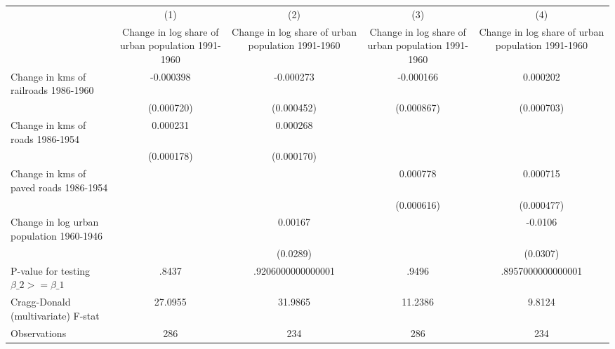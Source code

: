 {
\def\sym#1{\ifmmode^{#1}\else\(^{#1}\)\fi}
\begin{tabular}{l*{4}{c}}
\hline\hline
                &\multicolumn{1}{c}{(1)}&\multicolumn{1}{c}{(2)}&\multicolumn{1}{c}{(3)}&\multicolumn{1}{c}{(4)}\\
                &\multicolumn{1}{c}{Change in log share of urban population 1991-1960}&\multicolumn{1}{c}{Change in log share of urban population 1991-1960}&\multicolumn{1}{c}{Change in log share of urban population 1991-1960}&\multicolumn{1}{c}{Change in log share of urban population 1991-1960}\\
\hline
Change in kms of railroads 1986-1960&-0.000398         &-0.000273         &-0.000166         & 0.000202         \\
                &(0.000720)         &(0.000452)         &(0.000867)         &(0.000703)         \\
[1em]
Change in kms of roads 1986-1954& 0.000231         & 0.000268         &                  &                  \\
                &(0.000178)         &(0.000170)         &                  &                  \\
[1em]
Change in kms of paved roads 1986-1954&                  &                  & 0.000778         & 0.000715         \\
                &                  &                  &(0.000616)         &(0.000477)         \\
[1em]
Change in log urban population 1960-1946&                  &  0.00167         &                  &  -0.0106         \\
                &                  & (0.0289)         &                  & (0.0307)         \\
\hline
P-value for testing $\beta\_{2} >= \beta\_{1}$&    .8437         &.9206000000000001         &    .9496         &.8957000000000001         \\
Cragg-Donald (multivariate) F-stat&  27.0955         &  31.9865         &  11.2386         &   9.8124         \\
Observations    &      286         &      234         &      286         &      234         \\
\hline\hline
\end{tabular}
}

